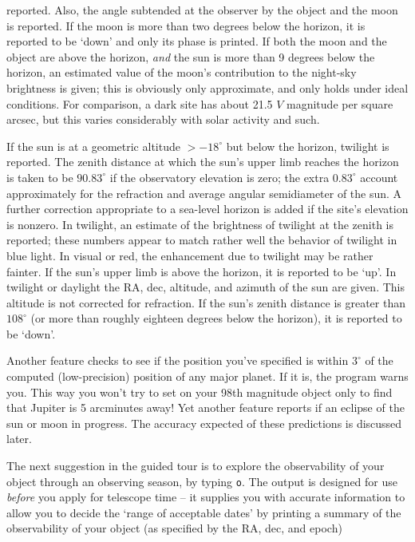 reported.  Also, the angle subtended at the observer by the object 
and the moon is reported.  If the moon is more than two degrees below
the horizon, it is reported to be `down' and only its phase is
printed.  If both the moon and the object are above the horizon, 
{\it and} the sun is more than 9 degrees below the horizon, an
estimated value of the moon's contribution to the night-sky brightness
is given; this is obviously only approximate, and only holds under
ideal conditions.  For comparison, a dark site has about 21.5
$V$ magnitude per square arcsec, but this varies considerably with 
solar activity and such.
\par
If the sun is at a geometric altitude $> -18^{\circ}$ but below the
horizon, twilight is reported.  The zenith distance at which the
sun's upper limb reaches the horizon is taken to be $90.83^{\circ}$
if the observatory elevation is zero; the extra $0.83^{\circ}$
account approximately for the refraction and average angular 
semidiameter of the sun.  A further correction appropriate
to a sea-level horizon is added if the site's elevation is nonzero.
In twilight, an estimate of the brightness of twilight at the 
zenith is reported; these numbers appear to match rather well
the behavior of twilight in blue light.  In visual or red, the 
enhancement due to twilight may be rather fainter.
If the sun's upper limb is above the horizon, 
it is reported to be `up'.  In twilight or daylight 
the RA, dec, altitude, and azimuth of the sun are given.
This altitude is not corrected for refraction.  If the sun's zenith distance
is greater than $108^{\circ}$ (or more than roughly
eighteen degrees below the horizon), it is reported to be `down'.
\par
Another feature checks to see if the position you've specified
is within $3^{\circ}$ of the computed (low-precision) position 
of any major planet.  If it is, the program warns you.  This way
you won't try to set on your 98th magnitude object only to find that Jupiter
is 5 arcminutes away!
Yet another feature reports if an eclipse of the
sun or moon in progress.  The accuracy expected of these predictions
is discussed later.


The next suggestion in the guided tour is to explore the
observability of your object through an observing season,
by typing {\tt o}.  
The output is designed for use {\it before} you apply for telescope time --
it supplies you with accurate information to allow you to decide the
`range of acceptable dates' by printing a summary of the observability
of your object (as specified by the RA, dec, and epoch)

